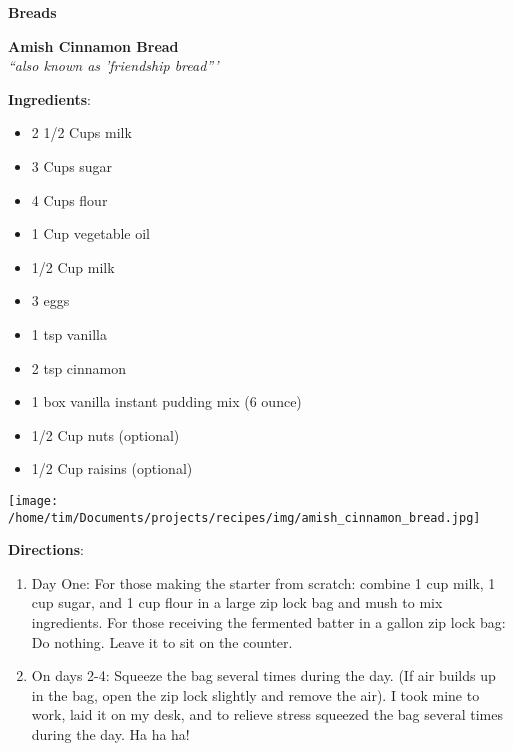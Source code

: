 \documentclass[11pt, twoside, openany]{book}
\begin{document}
{\newpage \LARGE \textbf{Breads}} \label{breads}\\
\noindent\begin{minipage}[t]{\linewidth}%
{\Large\textbf{Amish Cinnamon Bread}} \label{amish-cinnamon-bread}\hfill\textit{}\\
\textit{``also known as 'friendship bread'''}\\
\noindent\begin{minipage}[t]{0.78\linewidth}%
\textbf{Ingredients}:\vspace{-3mm}
\begin{multicols}{2}
\begin{itemize}\setlength\itemsep{-1mm}
\item 2 1/2 Cups milk
\item 3 Cups sugar
\item 4 Cups flour
\item 1 Cup vegetable oil
\item 1/2 Cup milk
\item 3 eggs
\item 1 tsp vanilla
\item 2 tsp cinnamon
\item 1 box vanilla instant pudding mix (6 ounce)
\item 1/2 Cup nuts (optional)
\item 1/2 Cup raisins (optional)
\end{itemize}
\end{multicols}
\end{minipage}
\noindent\begin{minipage}[t]{0.18\linewidth}
\centering \strut\vspace*{-\baselineskip}\newline
\texttt{[image: /home/tim/Documents/projects/recipes/img/amish\_cinnamon\_bread.jpg]}\\
\end{minipage}\vspace{3mm}
\textbf{Directions}:
\vspace{-3mm}\begin{enumerate}\setlength\itemsep{-1mm}
\item Day One: For those making the starter from scratch: combine 1 cup milk, 1 cup sugar, and 1 cup flour in a large zip lock bag and mush to mix ingredients. For those receiving the fermented batter in a gallon zip lock bag: Do nothing. Leave it to sit on the counter.
\item On days 2-4: Squeeze the bag several times during the day. (If air builds up in the bag, open the zip lock slightly and remove the air). I took mine to work, laid it on my desk, and to relieve stress squeezed the bag several times during the day. Ha ha ha!

\end{enumerate}
\end{minipage}
\end{document}

